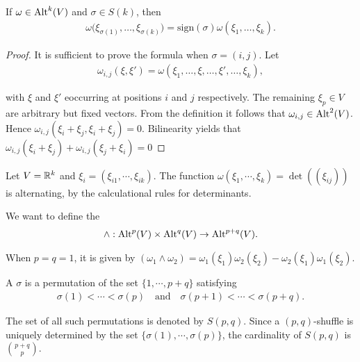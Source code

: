 \begin{lemma}
  If $\omega\in\operatorname{Alt}^k(V)$ and $\sigma\in S(k)$, then
  \begin{align*}
    \omega\big(\xi_{\sigma(1)},\ldots,\xi_{\sigma(k)}\big)=\mathrm{sign}(\sigma)\omega(\xi_{1},\ldots,\xi_{k}).
  \end{align*}
\end{lemma}

\begin{proof}
  It is sufficient to prove the formula when $\sigma = (i, j)$. Let
  \begin{align*}
    \omega_{i,j}(\xi,\xi')=\omega(\xi_{1},\ldots,\xi,\ldots,\xi',\ldots,\xi_{k}),
  \end{align*}

  with $\xi$ and $\xi'$ eoccurring at positions $i$ and $j$ respectively. The remaining $\xi_p\in V$
  are arbitrary but fixed vectors. From the definition it follows that $\omega_{i,j}\in\operatorname{Alt}^2(V)$.
  Hence $\omega_{i,j} (\xi_i + \xi_j, \xi_i + \xi_j) = 0$. Bilinearity yields that
  $\omega_{i,j} (\xi_i + \xi_j) + \omega_{i,j} (\xi_j + \xi_i) = 0$
\end{proof}


\begin{example}\label{example:2-3}
  Let $V = \mathbb{R}^k$ and $\xi_i = (\xi_{i1}, \cdots, \xi_{ik})$. The function $\omega(\xi_1, \cdots, \xi_k) = \det((\xi_{ij}))$
  is alternating, by the calculational rules for determinants.
\end{example}

We want to define the 
\begin{align*}
  \wedge: \operatorname{Alt}^p(V)\times\operatorname{Alt}^q(V) \to \operatorname{Alt}^{p+q}(V).
\end{align*}

When $p=q=1$, it is given by $(\omega_1\wedge\omega_2) = \omega_1(\xi_1)\omega_2(\xi_2) - \omega_2(\xi_1)\omega_1(\xi_2)$.

\begin{definition}\label{def:2-4}
  A  $\sigma$ is a permutation of the set $\{1, \cdots, p + q\}$ satisfying
  \begin{align*}
    \sigma(1) < \cdots < \sigma(p) \quad\text{and}\quad \sigma(p + 1) < \cdots < \sigma(p + q).
  \end{align*}

  The set of all such permutations is denoted by $S(p, q)$. Since a $(p, q)$-shuffle is uniquely determined by the
  set $\{\sigma(1),\cdots,\sigma(p)\}$, the cardinality of $S(p, q)$ is $\binom{p + q}{p}$.
\end{definition}


